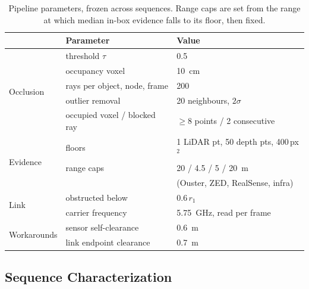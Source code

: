 \begin{table}[t]
\centering
\caption{Pipeline parameters, frozen across sequences. Range caps are set from
the range at which median in-box evidence falls to its floor, then fixed.}
\label{tab:params}
\footnotesize
\begin{tabular}{@{}lll@{}}
\toprule
& Parameter & Value \\
\midrule
\multirow{5}{*}{Occlusion}
  & threshold $\tau$              & 0.5 \\
  & occupancy voxel               & \SI{10}{\centi\metre} \\
  & rays per object, node, frame  & 200 \\
  & outlier removal               & 20 neighbours, $2\sigma$ \\
  & occupied voxel / blocked ray  & $\ge 8$ points / 2 consecutive \\
\midrule
\multirow{3}{*}{Evidence}
  & floors                        & 1 LiDAR pt, 50 depth pts, 400\,px$^2$ \\
  & range caps                    & 20 / 4.5 / 5 / \SI{20}{\metre} \\
  &                               & (Ouster, ZED, RealSense, infra) \\
\midrule
\multirow{2}{*}{Link}
  & obstructed below              & $0.6\,r_1$ \\
  & carrier frequency             & \SI{5.75}{\giga\hertz}, read per frame \\
\midrule
\multirow{2}{*}{Workarounds}
  & sensor self-clearance         & \SI{0.6}{\metre} \\
  & link endpoint clearance       & \SI{0.7}{\metre} \\
\bottomrule
\end{tabular}
\end{table}

\subsection{Sequence Characterization}
\label{sec:descriptor}

